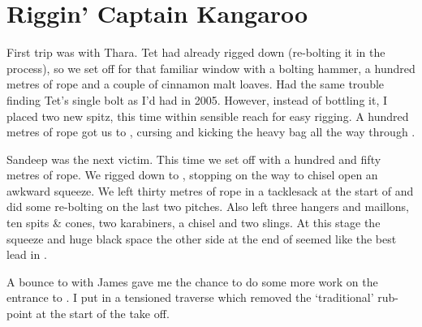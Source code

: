 \section{Riggin' Captain Kangaroo}


First trip was with Thara. Tet had already rigged down  (re-bolting
it in the process), so we set off for that familiar window with a
bolting hammer, a hundred metres of rope and a couple of cinnamon malt
loaves. Had the same trouble finding Tet's single bolt as I'd had in
2005. However, instead of bottling it, I placed two new spitz, this time
within sensible reach for easy rigging. A hundred metres of rope got us
to , cursing and kicking the heavy bag all the way
through .



Sandeep was the next victim. This time we set off with a hundred and
fifty metres of rope. We rigged down to , stopping on the
way to chisel open an awkward squeeze. We left thirty metres of rope in
a tacklesack at the start of  and did some re-bolting on the
last two pitches. Also left three hangers and maillons, ten spits \&
cones, two karabiners, a chisel and two slings. At this stage the
squeeze and huge black space the other side at the end of 
seemed like the best lead in .

A bounce to  with James gave me the chance to do some more work on
the entrance to . I put in a tensioned traverse which
removed the `traditional' rub-point at the start of the take off.

